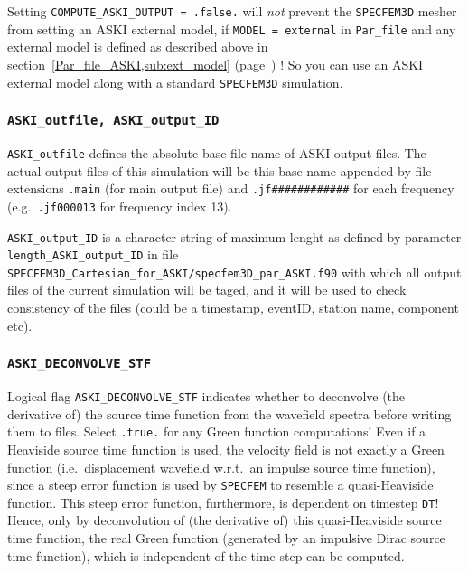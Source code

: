\documentclass[12pt,a4paper]{article}
\newcommand{\lcode}[1]{\nolinkurl{#1}}
\newcommand{\ASKI}{ {\ttfamily ASKI} }
\newcommand{\myref}[1]{\ref{#1} (page~\pageref{#1})}
\begin{document}
Setting \lcode{COMPUTE_ASKI_OUTPUT = .false.} will \emph{not} prevent the \lcode{SPECFEM3D} mesher from
setting an \ASKI{} external model, if \lcode{MODEL = external} in \lcode{Par_file} and any external
model is defined as described above in section~\myref{Par_file_ASKI,sub:ext_model}{} ! So you can
use an \ASKI{} external model along with a standard \lcode{SPECFEM3D} simulation.

\subsubsection*{\lcode{ASKI_outfile, ASKI_output_ID}}
\lcode{ASKI_outfile} defines the absolute base file name of \ASKI{} output files.
The actual output files of this simulation will be this base name appended by file extensions
\lcode{.main} (for main output file) and \lcode{.jf############} for each frequency (e.g.\ \lcode{.jf000013} for 
frequency index 13).

\lcode{ASKI_output_ID} is a character
string of maximum lenght as defined by parameter \lcode{length_ASKI_output_ID} in file\\
\lcode{SPECFEM3D_Cartesian_for_ASKI/specfem3D_par_ASKI.f90} 
with which all output files of the current simulation will be taged, and it will be used to check consistency 
of the files (could be a timestamp, eventID, station name, component etc).

\subsubsection*{\lcode{ASKI_DECONVOLVE_STF}}
Logical flag \lcode{ASKI_DECONVOLVE_STF} indicates whether to deconvolve (the derivative of) the source time 
function from the wavefield spectra before writing them to files. Select \lcode{.true.} for any Green function computations!
Even if a Heaviside source time function is used, the velocity field is not exactly a Green function (i.e.\ displacement 
wavefield w.r.t.\ an impulse source time function), since a steep error function is used by \lcode{SPECFEM} to resemble 
a quasi-Heaviside function. This steep error function, furthermore, is dependent on timestep \lcode{DT}! 
Hence, only by deconvolution of (the derivative of) this quasi-Heaviside source time function, the real Green function 
(generated by an impulsive Dirac source time function), which is independent of the time step can be computed.
\end{document}
